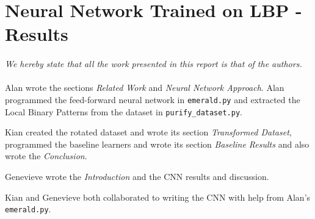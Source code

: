 \section{Neural Network Trained on LBP - Results} \label{appendix:images}




\newpage
\begin{multicols}{2}
\paragraph*{} \lettrine[nindent=0em,lines=1]{\textit{W}}{}\textit{e hereby state that all the work presented in this report is that of the authors. }
\paragraph*{} Alan wrote the sections \emph{Related Work} and \emph{Neural Network Approach}. Alan programmed the feed-forward neural network in \texttt{emerald.py} and extracted the Local Binary Patterns from the dataset in \texttt{purify\_dataset.py}. 
\par Kian created the rotated dataset and wrote its section \emph{Transformed Dataset}, programmed the baseline learners and wrote its section \emph{Baseline Results} and also wrote the \emph{Conclusion}. 
\par Genevieve wrote the \emph{Introduction} and the CNN results and discussion. 
\par Kian and Genevieve both collaborated to writing the CNN with help from Alan's \texttt{emerald.py}. 


\end{multicols}

